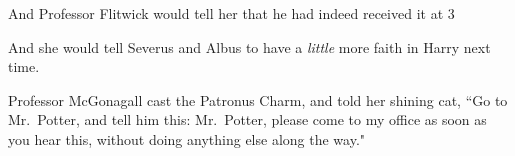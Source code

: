 And Professor Flitwick would tell her that he had indeed received it at 3\pm

And she would tell Severus and Albus to have a \emph{little} more faith in Harry next time.

Professor McGonagall cast the Patronus Charm, and told her shining cat, ``Go to Mr.~Potter, and tell him this: Mr.~Potter, please come to my office as soon as you hear this, without doing anything else along the way."

